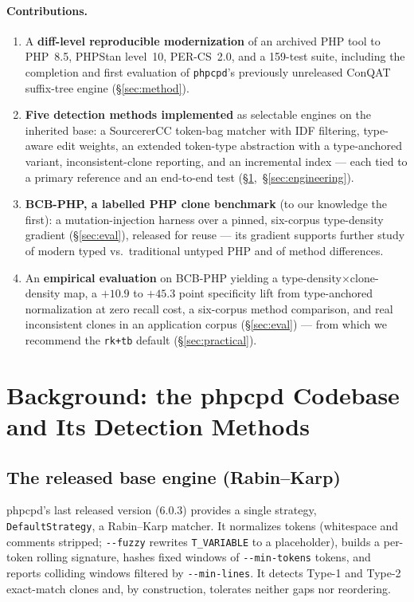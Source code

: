 \documentclass[10pt,a4paper]{article}
\newcounter{lem}[section]
\begin{document}
\paragraph{Contributions.}
\begin{enumerate}[leftmargin=1.4em,itemsep=1pt,topsep=2pt]
  \item A \textbf{diff-level reproducible modernization} of an archived PHP tool to PHP~8.5, PHPStan
        level~10, PER-CS~2.0, and a 159-test suite, including the completion and first evaluation of
        \texttt{phpcpd}'s previously unreleased ConQAT suffix-tree engine (\S\ref{sec:method}).
  \item \textbf{Five detection methods implemented} as selectable engines on the inherited base: a
        SourcererCC token-bag matcher with IDF filtering, type-aware edit weights, an extended
        token-type abstraction with a type-anchored variant, inconsistent-clone reporting, and an
        incremental index --- each tied to a primary reference and an end-to-end test
        (\S\ref{sec:methods},~\S\ref{sec:engineering}).
  \item \textbf{BCB-PHP, a labelled PHP clone benchmark} (to our knowledge the first): a
        mutation-injection harness over a pinned, six-corpus type-density gradient (\S\ref{sec:eval}),
        released for reuse --- its gradient supports further study of modern typed vs.\ traditional
        untyped PHP and of method
        differences.
  \item An \textbf{empirical evaluation} on BCB-PHP yielding a type-density$\times$clone-density map, a
        $+10.9$ to $+45.3$ point specificity lift from type-anchored normalization at zero recall cost,
        a six-corpus method comparison, and real inconsistent clones in an application corpus
        (\S\ref{sec:eval}) --- from which we recommend the \texttt{rk+tb} default (\S\ref{sec:practical}).
\end{enumerate}

\section{Background: the phpcpd Codebase and Its Detection Methods}
\label{sec:methods}

\subsection{The released base engine (Rabin--Karp)}
phpcpd's last released version (6.0.3) provides a single strategy, \texttt{DefaultStrategy}, a
Rabin--Karp matcher. It normalizes tokens (whitespace and comments stripped; \texttt{-{}-fuzzy}
rewrites \lstinline!T_VARIABLE! to a placeholder), builds a per-token rolling signature, hashes fixed
windows of \texttt{-{}-min-tokens} tokens, and reports colliding windows filtered by
\texttt{-{}-min-lines}. It detects Type-1 and Type-2 exact-match clones and, by construction, tolerates
neither gaps nor reordering.
\end{document}
